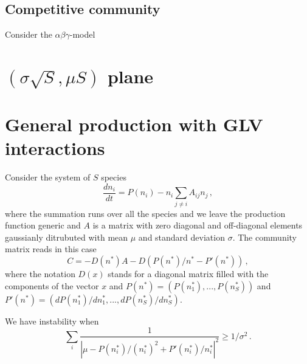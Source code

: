\documentclass[10pt]{article}
\begin{document}
\subsection{Competitive community}

Consider the $\alpha\beta\gamma$-model

\section{$(\sigma\sqrt{S},\mu S)$ plane}


\section{General production with GLV interactions}
Consider the system of $S$ species
\begin{equation}
    \frac{dn_i}{dt} = P(n_i) - n_i\sum_{j\neq i}A_{ij}n_j \, ,
\end{equation}
where the summation runs over all the species and we leave the production function generic
and $A$ is a matrix with zero diagonal and off-diagonal elements gaussianly
ditrubuted with mean $\mu$ and standard deviation $\sigma$.
The community matrix reads in this case
\begin{equation}
    C = -D(n^*)A - D(P(n^*)/n^*-P'(n^*)) \, ,
\end{equation}
where the notation $D(x)$ stands for a diagonal matrix filled 
with the components of the vector
$x$ and $P(n^*)=(P(n_1^*), ..., P(n_S^*))$ and $P'(n^*)=(dP(n_1^*)/dn_1^*, ..., dP(n_S^*)/dn_S^*)$.

We have instability when
\begin{equation}
    \sum_i \frac{1}{|\mu -P(n_i^*)/(n_i^*)^2+P'(n_i^*)/n_i^*|^2}\geq 1/\sigma^2 \, .
\end{equation}

\newpage




\end{document}
